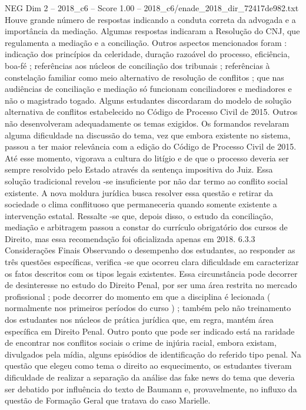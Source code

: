 \begin{textsample}{NEG Dim 2 – 2018\_c6 – Score 1.00 – 2018\_c6/enade\_2018\_dir\_72417de982.txt}
Houve grande número de respostas indicando a conduta correta da advogada e a importância da mediação.
Algumas respostas indicaram a Resolução do CNJ, que regulamenta a mediação e a conciliação.
Outros aspectos mencionados foram : indicação dos princípios da celeridade, duração razoável do processo, eficiência, boa-fé ; referências aos núcleos de conciliação dos tribunais ; referências à constelação familiar como meio alternativo de resolução de conflitos ; que nas audiências de conciliação e mediação só funcionam conciliadores e mediadores e não o magistrado togado.
Alguns estudantes discordaram do modelo de solução alternativa de conflitos estabelecido no Código de Processo Civil de 2015.
Outros não desenvolveram adequadamente os temas exigidos.
Os formandos revelaram alguma dificuldade na discussão do tema, vez que embora existente no sistema, passou a ter maior relevância com a edição do Código de Processo Civil de 2015.
Até esse momento, vigorava a cultura do litígio e de que o processo deveria ser sempre resolvido pelo Estado através da sentença impositiva do Juiz.
Essa solução tradicional revelou -se insuficiente por não dar termo ao conflito social existente.
A nova moldura jurídica busca resolver essa questão e retirar da sociedade o clima conflituoso que permaneceria quando somente existente a intervenção estatal.
Ressalte -se que, depois disso, o estudo da conciliação, mediação e arbitragem passou a constar do currículo obrigatório dos cursos de Direito, mas essa recomendação foi oficializada apenas em 2018. 6.3.3 Considerações Finais Observando o desempenho dos estudantes, ao responder as três questões específicas, verifica -se que ocorreu clara dificuldade em caracterizar os fatos descritos com os tipos legais existentes.
Essa circunstância pode decorrer de desinteresse no estudo do Direito Penal, por ser uma área restrita no mercado profissional ; pode decorrer do momento em que a disciplina é lecionada ( normalmente nos primeiros períodos do curso ) ; também pelo não treinamento dos estudantes nos núcleos de prática jurídica que, em regra, mantém área específica em Direito Penal.
Outro ponto que pode ser indicado está na raridade de encontrar nos conflitos sociais o crime de injúria racial, embora existam, divulgados pela mídia, alguns episódios de identificação do referido tipo penal.
Na questão que elegeu como tema o direito ao esquecimento, os estudantes tiveram dificuldade de realizar a separação da análise das fake news do tema que deveria ser debatido por influência do texto de Baumann e, provavelmente, no influxo da questão de Formação Geral que tratava do caso Marielle.

\end{textsample}
